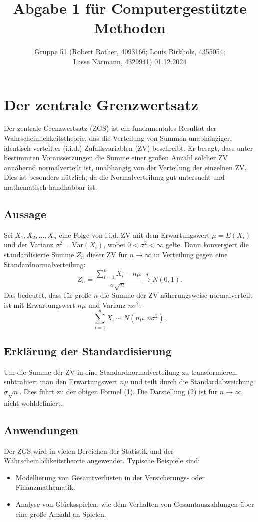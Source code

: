 \documentclass[a4paper,12pt]{article}
\title{Abgabe 1 für Computergestützte Methoden}
\author{Gruppe 51 (Robert Rother, 4093166; Louis Birkholz, 4355054;\\ Lasse Närmann, 4329941)
01.12.2024}
\date{}
\begin{document}
\maketitle

\tableofcontents

\newpage

\section{Der zentrale Grenzwertsatz}
Der zentrale Grenzwertsatz (ZGS) ist ein fundamentales Resultat der Wahrscheinlichkeitstheorie, das die Verteilung von Summen unabhängiger, identisch verteilter (i.i.d.) Zufallsvariablen (ZV) beschreibt. Er besagt, dass unter bestimmten Voraussetzungen die Summe einer großen Anzahl solcher ZV annähernd normalverteilt ist, unabhängig von der Verteilung der einzelnen ZV. Dies ist besonders nützlich, da die Normalverteilung gut untersucht und mathematisch handhabbar ist.

\subsection{Aussage}
Sei $X_1, X_2, \ldots, X_n$ eine Folge von i.i.d. ZV mit dem Erwartungswert $\mu = E(X_i)$ und der Varianz $\sigma^2 = \text{Var}(X_i)$, wobei $0 < \sigma^2 < \infty$ gelte. Dann konvergiert die standardisierte Summe $Z_n$ dieser ZV für $n \to \infty$ in Verteilung gegen eine Standardnormalverteilung:
\[
Z_n = \frac{\sum_{i=1}^n X_i - n\mu}{\sigma \sqrt{n}} \xrightarrow{d} N(0, 1). \tag{1}
\]
Das bedeutet, dass für große $n$ die Summe der ZV näherungsweise normalverteilt ist mit Erwartungswert $n\mu$ und Varianz $n\sigma^2$:
\[
\sum_{i=1}^n X_i \sim N(n\mu, n\sigma^2). \tag{2}
\]

\subsection{Erklärung der Standardisierung}
Um die Summe der ZV in eine Standardnormalverteilung zu transformieren, subtrahiert man den Erwartungswert $n\mu$ und teilt durch die Standardabweichung $\sigma\sqrt{n}$. Dies führt zu der obigen Formel (1). Die Darstellung (2) ist für $n \to \infty$ nicht wohldefiniert.

\subsection{Anwendungen}
Der ZGS wird in vielen Bereichen der Statistik und der Wahrscheinlichkeitstheorie angewendet. Typische Beispiele sind:
\begin{itemize}
    \item Modellierung von Gesamtverlusten in der Versicherungs- oder Finanzmathematik.
    \item Analyse von Glücksspielen, wie dem Verhalten von Gesamtauszahlungen über eine große Anzahl an Spielen.
\end{itemize}
\end{document}
